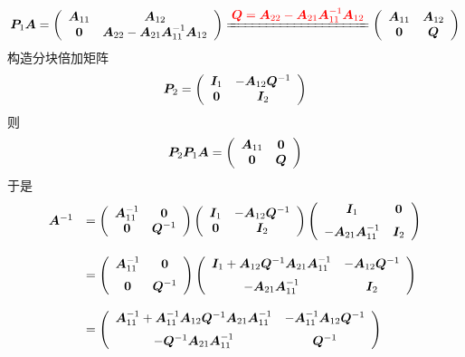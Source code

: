 \begin{jie}
  $$
  \PP_1\A = \left(
    \begin{array}{cc}
      \A_{11} & \A_{12} \\
      \zero & \A_{22}-\A_{21}\A_{11}^{-1}\A_{12}
    \end{array}
  \right)\xlongequal[]{\red{\ds \QQ=\A_{22}-\A_{21}\A_{11}^{-1}\A_{12}}}
  \left(
    \begin{array}{cc}
      \A_{11} & \A_{12} \\
      \zero & \QQ
    \end{array}
  \right)
  $$ 
  构造分块倍加矩阵
  $$
  \boldsymbol{P}_2 = \left(
    \begin{array}{cc}
      \boldsymbol{I}_1 & -\boldsymbol{A}_{12}\boldsymbol{Q}^{-1}\\
      \boldsymbol{0} & \boldsymbol{I}_2
    \end{array}
  \right)
  $$ 
  则
  $$
  \boldsymbol{P}_2\boldsymbol{P}_1\boldsymbol{A} = \left(
    \begin{array}{cc}
      \boldsymbol{A}_{11} & \boldsymbol{0}\\
      \boldsymbol{0} & \boldsymbol{Q}
    \end{array}
  \right)
  $$ 
  于是
  $$
  \begin{array}{rl}
    \boldsymbol{A}^{-1} & = \left(
      \begin{array}{cc}
        \boldsymbol{A}_{11}^{-1} & \boldsymbol{0}\\
        \boldsymbol{0} & \boldsymbol{Q}^{-1}
      \end{array}
    \right)\left(
      \begin{array}{cc}
        \boldsymbol{I}_1 & -\boldsymbol{A}_{12}\boldsymbol{Q}^{-1}\\
        \boldsymbol{0} & \boldsymbol{I}_2
      \end{array}
    \right)\left(
      \begin{array}{cc}
        \boldsymbol{I}_1 & \boldsymbol{0}\\[0.2cm]
        -\boldsymbol{A}_{21}\boldsymbol{A}_{11}^{-1} & \boldsymbol{I}_2
      \end{array}
    \right) \\[0.3in]
    & = \left(
      \begin{array}{cc}
        \boldsymbol{A}_{11}^{-1} & \boldsymbol{0}\\[0.2cm]
        \boldsymbol{0} & \boldsymbol{Q}^{-1}
      \end{array}
    \right)\left(
      \begin{array}{cc}
        \boldsymbol{I}_1+ \boldsymbol{A}_{12}\boldsymbol{Q}^{-1}\boldsymbol{A}_{21}\boldsymbol{A}_{11}^{-1}& -\boldsymbol{A}_{12}\boldsymbol{Q}^{-1}\\[0.2cm]
        -\boldsymbol{A}_{21}\boldsymbol{A}_{11}^{-1} & \boldsymbol{I}_2
      \end{array}
    \right)\\[0.3in]
    & = \left(
      \begin{array}{cc}
        \boldsymbol{A}_{11}^{-1}+ \boldsymbol{A}_{11}^{-1}\boldsymbol{A}_{12}\boldsymbol{Q}^{-1}\boldsymbol{A}_{21}\boldsymbol{A}_{11}^{-1}& -\boldsymbol{A}_{11}^{-1}\boldsymbol{A}_{12}\boldsymbol{Q}^{-1}\\[0.2cm]
        -\boldsymbol{Q}^{-1}\boldsymbol{A}_{21}\boldsymbol{A}_{11}^{-1} & \boldsymbol{Q}^{-1}
      \end{array}
    \right)
  \end{array}
  $$
\end{jie}



